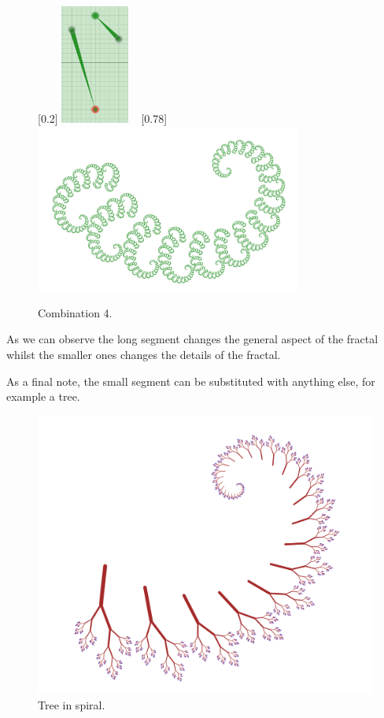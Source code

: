             \begin{figure}[H]
                \centering
                \caption{\label{ray_07} Combination 4.}
                [0.2\textwidth]
                    {\includegraphics[width=0.2\textwidth]{img/Simple_Techniques/Cases/rays/ray_set_07.png}}
                ~
                [0.78\textwidth]
                    {\includegraphics[width=0.78\textwidth]{img/Simple_Techniques/Cases/rays/ray_07.png}}
            \end{figure}


            As we can observe the long segment changes the general aspect of the fractal whilst the smaller ones changes the details of the fractal.

            As a final note, the small segment can be substituted with anything else, for example a tree.

            \begin{figure}[H]
                \centering
                \caption{\label{ray_08} Tree in spiral.}
                \includegraphics[width=0.6\TW]{img/Simple_Techniques/Cases/rays/ray_08.png}
            \end{figure}